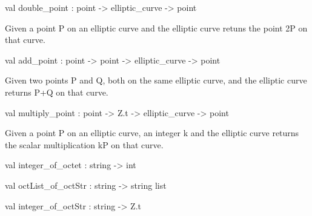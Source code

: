 \documentclass[12pt]{article}
\begin{document}
\begin{ocamldocsigend}
\label{val:Ecc.Ecc.double-underscorepoint}\begin{ocamldoccode}
val double_point : point -> elliptic_curve -> point
\end{ocamldoccode}
\begin{ocamldocdescription}
Given a point P on an elliptic curve and the elliptic curve retuns the point 2P 
        on that curve.


\end{ocamldocdescription}


\label{val:Ecc.Ecc.add-underscorepoint}\begin{ocamldoccode}
val add_point : point -> point -> elliptic_curve -> point
\end{ocamldoccode}
\begin{ocamldocdescription}
Given two points P and Q, both on the same elliptic curve, and the elliptic curve returns 
        P+Q on that curve.


\end{ocamldocdescription}


\label{val:Ecc.Ecc.multiply-underscorepoint}\begin{ocamldoccode}
val multiply_point : point -> Z.t -> elliptic_curve -> point
\end{ocamldoccode}
\begin{ocamldocdescription}
Given a point P on an elliptic curve, an integer k and the elliptic curve returns 
        the scalar multiplication kP on that curve.


\end{ocamldocdescription}


\label{val:Ecc.Ecc.integer-underscoreof-underscoreoctet}\begin{ocamldoccode}
val integer_of_octet : string -> int
\end{ocamldoccode}


\label{val:Ecc.Ecc.octList-underscoreof-underscoreoctStr}\begin{ocamldoccode}
val octList_of_octStr : string -> string list
\end{ocamldoccode}


\label{val:Ecc.Ecc.integer-underscoreof-underscoreoctStr}\begin{ocamldoccode}
val integer_of_octStr : string -> Z.t
\end{ocamldoccode}



\end{ocamldocsigend}
\end{document}
